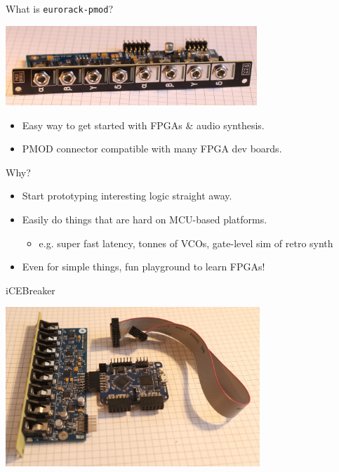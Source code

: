\documentclass{beamer}
\begin{document}

\begin{frame}{What is \texttt{eurorack-pmod}?}

    \begin{center}
        \includegraphics[height=3cm]{img/eurorack-pmod.jpg}
    \end{center}

    \begin{itemize}
        \item Easy way to get started with FPGAs \& audio synthesis.
        \item PMOD connector compatible with many FPGA dev boards.
    \end{itemize}

    \begin{block}{Why?}
        \begin{itemize}
            \item Start prototyping interesting logic straight away.
            \item Easily do things that are hard on MCU-based platforms.
                \begin{itemize}
                    \item e.g. super fast latency, tonnes of VCOs, gate-level sim of retro synth
                \end{itemize}
            \item Even for simple things, fun playground to learn FPGAs!
        \end{itemize}
    \end{block}

\end{frame}

\begin{frame}{iCEBreaker}

\begin{center}
    \includegraphics[height=6cm]{img/icebreaker.png}
\end{center}

\end{frame}
\end{document}
